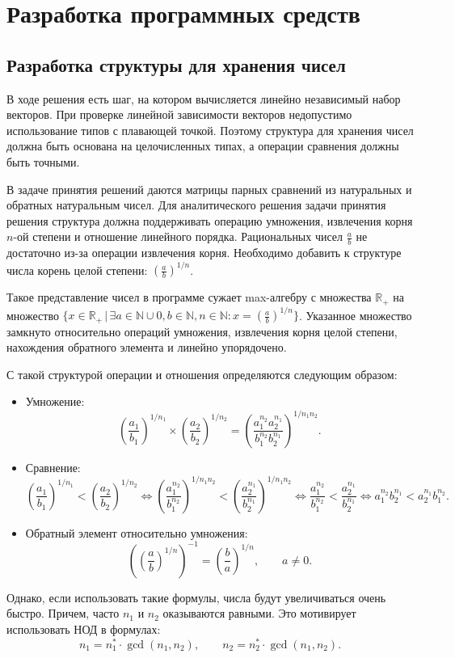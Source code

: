 \documentclass[specialist, substylefile = spbureport.rtx,
    subf,href,colorlinks=true, 12pt]{disser}
\begin{document}
    \chapter{Разработка программных средств}

    \section{Разработка структуры для хранения чисел}

    В ходе решения есть шаг, на котором вычисляется линейно независимый набор векторов. При проверке линейной зависимости векторов недопустимо использование типов с плавающей точкой. Поэтому структура для хранения чисел должна быть основана на целочисленных типах, а операции сравнения должны быть точными.

    В задаче принятия решений даются матрицы парных сравнений из натуральных и обратных натуральным чисел.
    Для аналитического решения задачи принятия решения структура должна поддерживать операцию умножения, извлечения корня $n$-ой степени и отношение линейного порядка.
    Рациональных чисел $\displaystyle \frac{a}{b}$ не достаточно из-за операции извлечения корня. 
    Необходимо добавить к структуре числа корень целой степени:  $\displaystyle \left(\frac{a}{b}\right)^{1/n}$.
    
    Такое представление чисел в программе сужает max-алгебру с множества $\mathbb{R}_+$ на множество $\{x \in \mathbb{R}_+ \, |\, \exists a \in \mathbb{N} \cup 0, b \in \mathbb{N}, n \in \mathbb{N}: x = \displaystyle \left(\frac{a}{b}\right)^{1/n}\}$. Указанное множество замкнуто относительно операций умножения, извлечения корня целой степени, нахождения обратного элемента и линейно упорядочено. 

    С такой структурой операции и отношения определяются следующим образом:
    \begin{itemize}
        \item Умножение:
        $$ \left(\frac{a_1}{b_1}\right)^{1/n_1} \times \left(\frac{a_2}{b_2}\right)^{1/n_2} = \left(\frac{a_1^{n_2}a_2^{n_1}}{b_1^{n_2}b_2^{n_1}}\right)^{1/n_1n_2}.$$
        \item Сравнение:
        $$ \left(\frac{a_1}{b_1}\right)^{1/n_1} < \left(\frac{a_2}{b_2}\right)^{1/n_2} \Leftrightarrow
        \left(\frac{a_1^{n_2}}{b_1^{n_2}}\right)^{1/n_1n_2} < \left(\frac{a_2^{n_1}}{b_2^{n_1}}\right)^{1/n_1n_2}\Leftrightarrow
        \frac{a_1^{n_2}}{b_1^{n_2}} < \frac{a_2^{n_1}}{b_2^{n_1}}\Leftrightarrow
        {a_1^{n_2}}{b_2^{n_1}} < {a_2^{n_1}}{b_1^{n_2}}.$$
        \item Обратный элемент относительно умножения:
        $$ \left(\left(\frac{a}{b}\right)^{1/n}\right)^{-1} = \left(\frac{b}{a}\right)^{1/n}, \qquad a \neq 0.$$
    \end{itemize}
    Однако, если использовать такие формулы, числа будут увеличиваться очень быстро.
    Причем, часто $n_1$ и $n_2$ оказываются равными. Это мотивирует использовать НОД в формулах:
    $$n_1 =  n^*_1 \cdot \gcd(n_1, n_2), \qquad n_2 =  n^*_2 \cdot \gcd(n_1, n_2).$$
\end{document}
